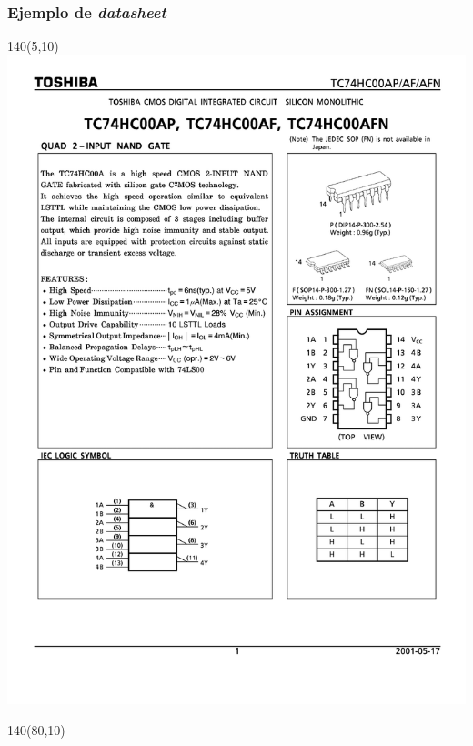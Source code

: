 \documentclass[aspectratio=169]{beamer}
\begin{document}
\begin{frame}[fragile,t]
    \frametitle{Ejemplo de \emph{datasheet}}
    \begin{textblock}{140}(5,10)
    \includegraphics[page=1,trim = 0mm 116mm 0mm 0mm,clip,scale=0.37]{pdfs/TC74HC00AP.pdf}
    \end{textblock}
    \begin{textblock}{140}(80,10)

\end{textblock}
\end{frame}
\end{document}
